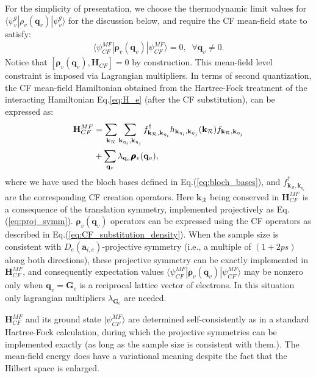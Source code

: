 For the simplicity of presentation, we choose the thermodynamic limit values for $\langle\psi^g_v|\rho_v(\mathbf q_v)|\psi^g_v\rangle$ for the discussion below, and require the CF mean-field state to satisfy:
\begin{align}
    \langle \psi^{MF}_{CF}|\pmb{\boldsymbol\rho}_v(\mathbf q_v)|\psi^{MF}_{CF}\rangle=0,\;\; \forall \mathbf q_v\neq 0.\label{eq:mf_constraint_1}
\end{align}
Notice that $[\pmb{\boldsymbol\rho}_v(\mathbf q_v),\mathbf H_{CF}]=0$ by construction. This mean-field level constraint is imposed via Lagrangian multipliers.  In terms of second quantization, the CF mean-field Hamiltonian obtained from the Hartree-Fock treatment of the interacting Hamiltonian Eq.\eqref{eq:H_e} (after the CF substitution), can be expressed as:
\begin{align}
    \mathbf H_{CF}^{MF} & =\sum_{\mathbf k_{\mathcal R}} \sum_{\mathbf k_{\eta_i},\mathbf k_{\eta_j}} f^\dagger_{\mathbf k_{\mathcal R},\mathbf k_{\eta_i}} h_{\mathbf k_{\eta_i},\mathbf k_{\eta_j}}(\mathbf k_{\mathcal R}) f_{\mathbf k_{\mathcal R},\mathbf k_{\eta_j}}\notag \\
                        & +\sum_{\mathbf q_v}\lambda_{\mathbf q_v}\pmb{\boldsymbol\rho}_v(\mathbf q_v),
\end{align}
where we have used the bloch bases defined in Eq.(\ref{eq:bloch_bases}), and $f^\dagger_{\mathbf k_{\mathcal R},\mathbf k_{\eta_i}}$ are the corresponding CF creation operators. Here $\bm k_{\mathcal R}$ being conserved in $\mathbf H_{CF}^{MF}$ is a consequence of the translation symmetry, implemented projectively as Eq.(\ref{eq:proj_symm}). $\pmb{\boldsymbol\rho}_v(\mathbf q_v)$ operators can be expressed using the CF operators as described in Eq.(\ref{eq:CF_substitution_density}). When the sample size is consistent with $D_e(\mathbf a_{i,e})$-projective symmetry (i.e., a multiple of $(1+2ps)$ along both directions), these projective symmetry can be exactly implemented in $\mathbf H_{CF}^{MF}$, and consequently expectation values $\langle \psi^{MF}_{CF}|\pmb{\boldsymbol\rho}_v(\mathbf q_v)|\psi^{MF}_{CF}\rangle$ may be nonzero only when $\mathbf q_v=\mathbf G_e$ is a reciprocal lattice vector of electrons. In this situation only lagrangian multipliers $\lambda_{\mathbf G_e}$ are needed.

$\mathbf H_{CF}^{MF}$ and its ground state $|\psi^{MF}_{CF}\rangle$ are determined self-consistently as in a standard Hartree-Fock calculation, during which the projective symmetries can be implemented exactly (as long as the sample size is consistent with them.). The mean-field energy does have a variational meaning despite the fact that the Hilbert space is enlarged.

